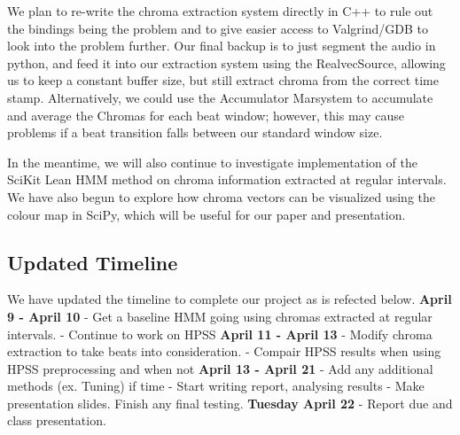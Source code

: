 \documentclass{article}
\begin{document}
We plan to re-write the chroma extraction system directly in C++ to rule out the bindings being the problem and to give easier access to Valgrind/GDB to look into the problem further. Our final backup is to just segment the audio in python, and feed it into our extraction system using the
RealvecSource, allowing us to keep a constant buffer size, but still extract chroma from the correct time stamp. Alternatively, we could use the Accumulator Marsystem to accumulate and average the Chromas for each beat window; however, this may cause problems if a beat transition falls between our standard window size. 

In the meantime, we will also continue to investigate implementation of the SciKit Lean HMM method on chroma information extracted at regular intervals. We have also begun to explore how chroma vectors can be visualized using the colour map in SciPy, which will be useful for our paper and presentation.

\subsection{Updated Timeline}

We have updated the timeline to complete our project as is refected below. \newline \newline
{\bf April 9 - April 10}\newline
- Get a baseline HMM going using chromas extracted at regular intervals. \newline
- Continue to work on HPSS
\newline
\newline
{\bf April 11 - April 13}\newline
- Modify chroma extraction to take beats into consideration. \newline
- Compair HPSS results when using HPSS preprocessing and when not
\newline
\newline
{\bf April 13 - April 21}\newline
- Add any additional methods (ex. Tuning) if time \newline
- Start writing report, analysing results \newline
- Make presentation slides. Finish any final testing.
\newline
\newline
{\bf Tuesday April 22}\newline
- Report due and class presentation. 
\end{document}

